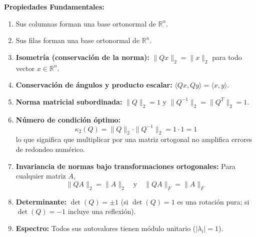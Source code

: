 \documentclass[11pt,a4paper]{article}
\begin{document}
\textbf{Propiedades Fundamentales:}
\begin{enumerate}
    \item Sus columnas forman una base ortonormal de $\mathbb{R}^n$.
    \item Sus filas forman una base ortonormal de $\mathbb{R}^n$.
    \item \textbf{Isometría (conservación de la norma):} $\|Qx\|_2 = \|x\|_2$ para todo vector $x \in \mathbb{R}^n$.
    \item \textbf{Conservación de ángulos y producto escalar:} $\langle Qx, Qy \rangle = \langle x, y \rangle$.
    \item \textbf{Norma matricial subordinada:} $\|Q\|_2 = 1$ y $\|Q^{-1}\|_2 = \|Q^T\|_2 = 1$.
    \item \textbf{Número de condición óptimo:}
    \[
    \kappa_2(Q) = \|Q\|_2 \cdot \|Q^{-1}\|_2 = 1 \cdot 1 = 1
    \]
    lo que significa que multiplicar por una matriz ortogonal no amplifica errores de redondeo numérico.
    \item \textbf{Invariancia de normas bajo transformaciones ortogonales:} Para cualquier matriz $A$,
    \[
    \|QA\|_2 = \|A\|_2 \quad \text{y} \quad \|QA\|_F = \|A\|_F
    \]
    \item \textbf{Determinante:} $\det(Q) = \pm 1$ (si $\det(Q) = 1$ es una rotación pura; si $\det(Q) = -1$ incluye una reflexión).
    \item \textbf{Espectro:} Todos sus autovalores tienen módulo unitario ($|\lambda_i| = 1$).
\end{enumerate}
\end{document}
